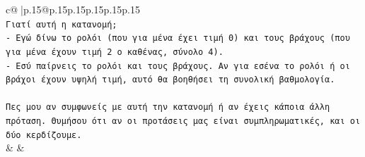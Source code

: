 \documentclass{article}
\begin{document}
{\begin{supertabular}{c@{$\;$}|p{.15\linewidth}@{}p{.15\linewidth}p{.15\linewidth}p{.15\linewidth}p{.15\linewidth}p{.15\linewidth}}
{{{\\ 
\texttt{Γιατί αυτή η κατανομή;} \\
\texttt{{-} Εγώ δίνω το ρολόι (που για μένα έχει τιμή 0) και τους βράχους (που για μένα έχουν τιμή 2 ο καθένας, σύνολο 4).} \\
\texttt{{-} Εσύ παίρνεις το ρολόι και τους βράχους. Αν για εσένα το ρολόι ή οι βράχοι έχουν υψηλή τιμή, αυτό θα βοηθήσει τη συνολική βαθμολογία.} \\
\\ 
\texttt{Πες μου αν συμφωνείς με αυτή την κατανομή ή αν έχεις κάποια άλλη πρόταση. Θυμήσου ότι αν οι προτάσεις μας είναι συμπληρωματικές, και οι δύο κερδίζουμε.} \\
            }
        }
    }
    & & \\ \\


\end{supertabular}}
\end{document}
